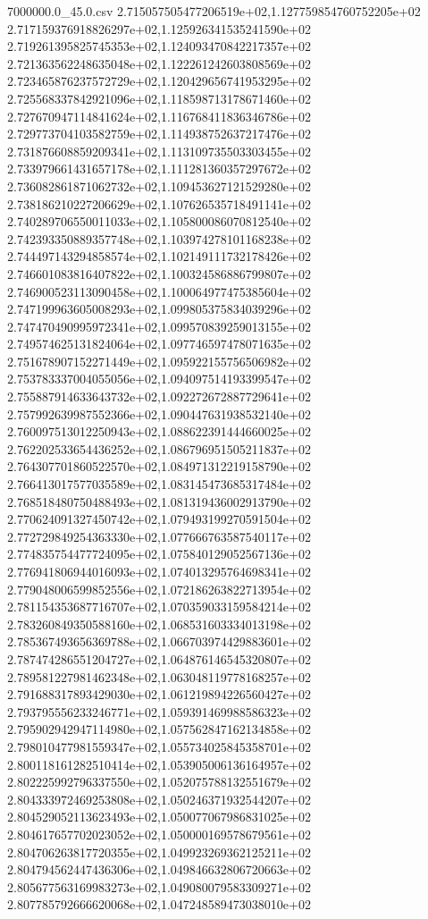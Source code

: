 \begin{filecontents*}{7000000.0_45.0.csv}
2.715057505477206519e+02,1.127759854760752205e+02
2.717159376918826297e+02,1.125926341535241590e+02
2.719261395825745353e+02,1.124093470842217357e+02
2.721363562248635048e+02,1.122261242603808569e+02
2.723465876237572729e+02,1.120429656741953295e+02
2.725568337842921096e+02,1.118598713178671460e+02
2.727670947114841624e+02,1.116768411836346786e+02
2.729773704103582759e+02,1.114938752637217476e+02
2.731876608859209341e+02,1.113109735503303455e+02
2.733979661431657178e+02,1.111281360357297672e+02
2.736082861871062732e+02,1.109453627121529280e+02
2.738186210227206629e+02,1.107626535718491141e+02
2.740289706550011033e+02,1.105800086070812540e+02
2.742393350889357748e+02,1.103974278101168238e+02
2.744497143294858574e+02,1.102149111732178426e+02
2.746601083816407822e+02,1.100324586886799807e+02
2.746900523113090458e+02,1.100064977475385604e+02
2.747199963605008293e+02,1.099805375834039296e+02
2.747470490995972341e+02,1.099570839259013155e+02
2.749574625131824064e+02,1.097746597478071635e+02
2.751678907152271449e+02,1.095922155756506982e+02
2.753783337004055056e+02,1.094097514193399547e+02
2.755887914633643732e+02,1.092272672887729641e+02
2.757992639987552366e+02,1.090447631938532140e+02
2.760097513012250943e+02,1.088622391444660025e+02
2.762202533654436252e+02,1.086796951505211837e+02
2.764307701860522570e+02,1.084971312219158790e+02
2.766413017577035589e+02,1.083145473685317484e+02
2.768518480750488493e+02,1.081319436002913790e+02
2.770624091327450742e+02,1.079493199270591504e+02
2.772729849254363330e+02,1.077666763587540117e+02
2.774835754477724095e+02,1.075840129052567136e+02
2.776941806944016093e+02,1.074013295764698341e+02
2.779048006599852556e+02,1.072186263822713954e+02
2.781154353687716707e+02,1.070359033159584214e+02
2.783260849350588160e+02,1.068531603334013198e+02
2.785367493656369788e+02,1.066703974429883601e+02
2.787474286551204727e+02,1.064876146545320807e+02
2.789581227981462348e+02,1.063048119778168257e+02
2.791688317893429030e+02,1.061219894226560427e+02
2.793795556233246771e+02,1.059391469988586323e+02
2.795902942947114980e+02,1.057562847162134858e+02
2.798010477981559347e+02,1.055734025845358701e+02
2.800118161282510414e+02,1.053905006136164957e+02
2.802225992796337550e+02,1.052075788132551679e+02
2.804333972469253808e+02,1.050246371932544207e+02
2.804529052113623493e+02,1.050077067986831025e+02
2.804617657702023052e+02,1.050000169578679561e+02
2.804706263817720355e+02,1.049923269362125211e+02
2.804794562447436306e+02,1.049846632806720663e+02
2.805677563169983273e+02,1.049080079583309271e+02
2.807785792666620068e+02,1.047248589473038010e+02

\end{filecontents*}

